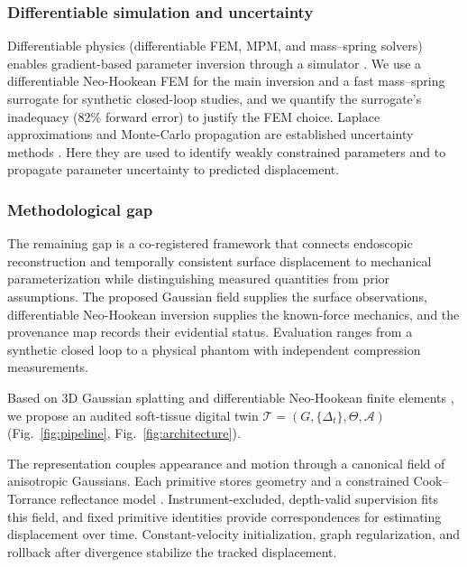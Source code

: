 \documentclass[pdflatex,lineno,referee,sn-vancouver,Numbered]{sn-jnl}
\begin{document}
\subsubsection{Differentiable simulation and uncertainty}
Differentiable physics (differentiable FEM, MPM, and mass--spring
solvers) enables gradient-based parameter inversion through a simulator
\cite{pacnerf,physgaussian,hu2020difftaichi,sanchezgonzalez2020}. We use a
differentiable Neo-Hookean FEM for the main inversion and a fast
mass--spring surrogate for synthetic closed-loop studies, and we quantify
the surrogate's inadequacy (82\% forward error) to justify the FEM choice.
Laplace approximations and Monte-Carlo propagation are established
uncertainty methods \cite{kendall2017,gal2016,lakshminarayanan2017}. Here
they are used to identify weakly constrained parameters and to propagate
parameter uncertainty to predicted displacement.

\subsubsection{Methodological gap}
\label{sec:gaps}
The remaining gap is a co-registered framework that connects endoscopic
reconstruction and temporally consistent surface displacement to
mechanical parameterization while distinguishing measured quantities from
prior assumptions. The proposed Gaussian field supplies the surface
observations, differentiable Neo-Hookean inversion supplies the
known-force mechanics, and the provenance map records their evidential
status. Evaluation ranges from a synthetic closed loop to a physical
phantom with independent compression measurements.

Based on 3D Gaussian splatting \cite{gaussiansplatting} and differentiable
Neo-Hookean finite elements \cite{holzapfel2000,hu2020difftaichi}, we
propose an audited soft-tissue digital twin
$\mathcal{T}=(G,\{\Delta_t\},\Theta,\mathcal{A})$
(Fig.~\ref{fig:pipeline}, Fig.~\ref{fig:architecture}).

The representation couples appearance and motion through a canonical field
of anisotropic Gaussians. Each primitive stores geometry and a constrained
Cook--Torrance reflectance model \cite{cooktorrance}. Instrument-excluded,
depth-valid supervision fits this field, and fixed primitive identities
provide correspondences for estimating displacement over time.
Constant-velocity initialization, graph regularization, and rollback after
divergence stabilize the tracked displacement.
\end{document}
